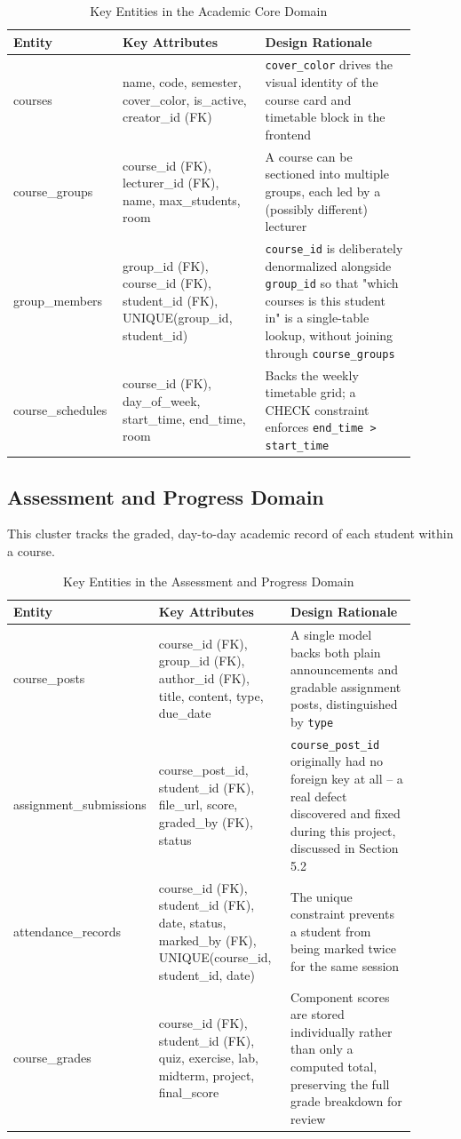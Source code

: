 \documentclass[12pt,a4paper]{report}
\begin{document}
\begin{longtable}{@{}p{0.20\linewidth}p{0.34\linewidth}p{0.36\linewidth}@{}}
\caption{Key Entities in the Academic Core Domain}\\
\toprule
\textbf{Entity} & \textbf{Key Attributes} & \textbf{Design Rationale} \\
\midrule
\endhead
courses & name, code, semester, cover\_color, is\_active, creator\_id (FK) &
  \texttt{cover\_color} drives the visual identity of the course card and timetable block in the frontend \\
course\_groups & course\_id (FK), lecturer\_id (FK), name, max\_students, room &
  A course can be sectioned into multiple groups, each led by a (possibly different) lecturer \\
group\_members & group\_id (FK), course\_id (FK), student\_id (FK), UNIQUE(group\_id, student\_id) &
  \texttt{course\_id} is deliberately denormalized alongside \texttt{group\_id} so that "which courses is this student in" is a single-table lookup, without joining through \texttt{course\_groups} \\
course\_schedules & course\_id (FK), day\_of\_week, start\_time, end\_time, room &
  Backs the weekly timetable grid; a CHECK constraint enforces \texttt{end\_time > start\_time} \\
\bottomrule
\end{longtable}

\subsection{Assessment and Progress Domain}

This cluster tracks the graded, day-to-day academic record of each
student within a course.

\begin{longtable}{@{}p{0.20\linewidth}p{0.34\linewidth}p{0.36\linewidth}@{}}
\caption{Key Entities in the Assessment and Progress Domain}\\
\toprule
\textbf{Entity} & \textbf{Key Attributes} & \textbf{Design Rationale} \\
\midrule
\endhead
course\_posts & course\_id (FK), group\_id (FK), author\_id (FK), title, content, type, due\_date &
  A single model backs both plain announcements and gradable assignment posts, distinguished by \texttt{type} \\
assignment\_submissions & course\_post\_id, student\_id (FK), file\_url, score, graded\_by (FK), status &
  \texttt{course\_post\_id} originally had no foreign key at all -- a real defect discovered and fixed during this project, discussed in Section 5.2 \\
attendance\_records & course\_id (FK), student\_id (FK), date, status, marked\_by (FK), UNIQUE(course\_id, student\_id, date) &
  The unique constraint prevents a student from being marked twice for the same session \\
course\_grades & course\_id (FK), student\_id (FK), quiz, exercise, lab, midterm, project, final\_score &
  Component scores are stored individually rather than only a computed total, preserving the full grade breakdown for review \\
\bottomrule
\end{longtable}
\end{document}

